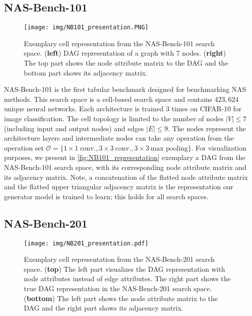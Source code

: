 \documentclass[runningheads]{llncs}
\begin{document}
\subsection{NAS-Bench-101}

\begin{figure*}
	\centering
	\texttt{[image: img/NB101\_presentation.PNG]}
	
	\caption{Exemplary cell representation from the NAS-Bench-101 search space. (\textbf{left}) DAG representation of a graph with 7 nodes. (\textbf{right}) The top part shows the node attribute matrix to the DAG and the bottom part shows its adjacency matrix. \label{fig:NB101_representation}}
	
\end{figure*}
NAS-Bench-101 is the first tabular benchmark designed for benchmarking NAS methods.
This search space is a cell-based search space and contains $423,624$ unique neural networks.
Each architecture is trained $3$ times on CIFAR-10 \cite{2009CIFAR} for image classification.
The cell topology is limited to the number of nodes $\vert V \vert \leq 7$ (including input and output nodes) and edges $\vert E \vert \leq 9$.
The nodes represent the architecture layers and intermediate nodes can take any operation from the operation set $\mathcal{O} = \{1 \times 1~\textrm{conv.}, 3 \times 3~\textrm{conv.}, 3 \times 3~\textrm{max pooling}\}$.
For visualization purposes, we present in \autoref{fig:NB101_representation} exemplary a DAG from the NAS-Bench-101 search space, with its corresponding node attribute matrix and its adjacency matrix. Note, a concatenation of the flatted node attribute matrix and the flatted upper triangular adjacency matrix is the representation our generator model is trained to learn; this holds for all search spaces.


\subsection{NAS-Bench-201}
\begin{figure*}
	\centering
	\texttt{[image: img/NB201\_presentation.pdf]}
	\caption{Exemplary cell representation from the NAS-Bench-201 search space. (\textbf{top}) The left part visualizes the DAG representation with node attributes instead of edge attributes. The right part shows the true DAG representation in the NAS-Bench-201 search space. (\textbf{bottom}) The left part shows the node attribute matrix to the DAG and the right part shows its adjacency matrix. \label{fig:NB201_representation}}
\end{figure*}
\end{document}
